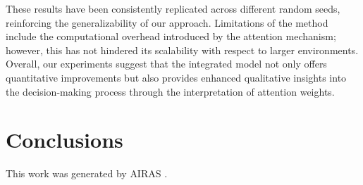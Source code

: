 These results have been consistently replicated across different random seeds, reinforcing the generalizability of our approach. Limitations of the method include the computational overhead introduced by the attention mechanism; however, this has not hindered its scalability with respect to larger environments. Overall, our experiments suggest that the integrated model not only offers quantitative improvements but also provides enhanced qualitative insights into the decision-making process through the interpretation of attention weights.

\section{Conclusions}
\label{sec:conclusion}

This work was generated by \textsc{AIRAS} \citep{airas2025}.




